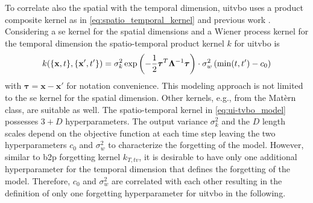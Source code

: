 To correlate also the spatial with the temporal dimension, \gls{uitvbo} uses a product composite kernel as in \eqref{eq:spatio_temporal_kernel} and previous work \cite{Bogunovic_2016}\cite{Nyikosa_2018}. Considering a \gls{se} kernel for the spatial dimensions and a Wiener process kernel for the temporal dimension the spatio-temporal product kernel $k$ for \gls{uitvbo} is
\begin{equation}
    k(\{\mathbf{x},t\},\{\mathbf{x}',t'\}) = \sigma_k^2\exp\left(-\frac{1}{2} \boldsymbol\tau^T \mathrm{\mathbf{\Lambda}}^{-1} \boldsymbol\tau\right) \cdot \sigma_w^2 \left( \min(t,t') - c_0\right)
    \label{eq:ui-tvbo_model}
\end{equation}
with $\boldsymbol\tau = \mathbf{x} - \mathbf{x}'$ for notation convenience. This modeling approach is not limited to the \gls{se} kernel for the spatial dimension. Other kernels, e.g., from the Matèrn class, are suitable as well. The spatio-temporal kernel in \eqref{eq:ui-tvbo_model} possesses $3 + D$ hyperparameters. The output variance $\sigma_k^2$ and the $D$ length scales depend on the objective function at each time step leaving the two hyperparameters $c_0$ and $\sigma_w^2$ to characterize the forgetting of the model. However, similar to \gls{b2p} forgetting kernel $k_{T,tv}$, it is desirable to have only one additional hyperparameter for the temporal dimension that defines the forgetting of the model. Therefore, $c_0$ and $\sigma_w^2$ are correlated with each other resulting in the definition of only one forgetting hyperparameter for \gls{uitvbo} in the following.

